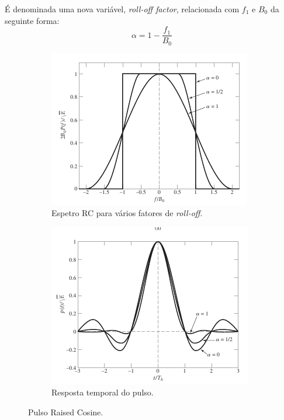 É denominada uma nova variável, \textit{roll-off factor}, relacionada com $f_1$ e $B_0$ da seguinte forma:
$$
    \boxed{\alpha = 1 - \frac{f_1}{B_0}}
$$
\vspace{-1em}
\begin{figure}[ht] 
    \begin{subfigure}[b]{0.5\linewidth}
        \centering
        \includegraphics[width=1\linewidth]{img/digital/ISI/MagRRC.png}
        \caption{Espetro RC para vários fatores de \textit{roll-off}.} 
        \label{fig:RRCMag} 
        \vspace{1ex}
    \end{subfigure}%
    \begin{subfigure}[b]{0.5\linewidth}
        \centering
        \includegraphics[width=1\linewidth]{img/digital/ISI/TempoRRC.png} 
        \caption{Resposta temporal do pulso.} 
        \label{fig:RRCTempo} 
        \vspace{1ex}
    \end{subfigure} 
    \caption{Pulso Raised Cosine.}
    \label{fig:RRC}
\end{figure}

